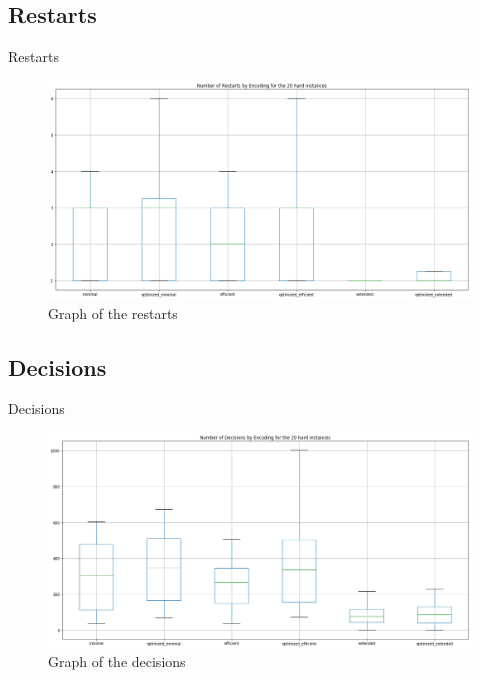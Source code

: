 \documentclass[11pt]{beamer}
\begin{document}
\subsection{Restarts}
\begin{frame}{Restarts}
\begin{figure}
\includegraphics[scale=0.25]{report/restarts}
\caption{Graph of the restarts}
\end{figure}
\end{frame}

\subsection{Decisions}
\begin{frame}{Decisions}
\begin{figure}
\includegraphics[scale=0.25]{report/decisions}
\caption{Graph of the decisions}
\end{figure}
\end{frame}
\end{document}
